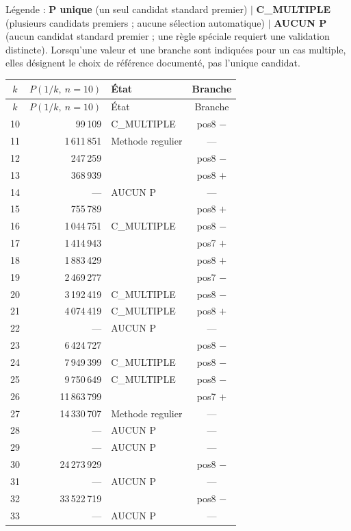 \documentclass[11pt,a4paper]{article}
\begin{document}
\begin{boitenote}
\begin{boitenote}[Inspiration]
\begin{boitenote}
\begin{boitenote}
Légende : \textbf{P unique} (un seul candidat standard premier) $\mid$
\textbf{C\_MULTIPLE} (plusieurs candidats premiers ; aucune sélection
automatique) $\mid$ \textbf{AUCUN P} (aucun candidat standard premier ; une
règle spéciale requiert une validation distincte). Lorsqu'une valeur et une
branche sont indiquées pour un cas multiple, elles désignent le choix de
référence documenté, pas l'unique candidat.

{\small
\begin{longtable}{@{}c r l c@{}}
\toprule
\rowcolor{spectralgris}
$k$ & $P(1/k,\ n=10)$ & État & Branche \\
\midrule
\endfirsthead
\toprule
\rowcolor{spectralgris}
$k$ & $P(1/k,\ n=10)$ & État & Branche \\
\midrule
\endhead
10 & 99\,109 & C\_MULTIPLE & pos8 $-$ \\
11 & 1\,611\,851 & Methode regulier & --- \\
12 & 247\,259 & & pos8 $-$ \\
13 & 368\,939 & & pos8 $+$ \\
14 & --- & AUCUN P & --- \\
15 & 755\,789 & & pos8 $+$ \\
16 & 1\,044\,751 & C\_MULTIPLE & pos8 $-$ \\
17 & 1\,414\,943 & & pos7 $+$ \\
18 & 1\,883\,429 & & pos8 $+$ \\
19 & 2\,469\,277 & & pos7 $-$ \\
20 & 3\,192\,419 & C\_MULTIPLE & pos8 $-$ \\
21 & 4\,074\,419 & C\_MULTIPLE & pos8 $+$ \\
22 & --- & AUCUN P & --- \\
23 & 6\,424\,727 & & pos8 $-$ \\
24 & 7\,949\,399 & C\_MULTIPLE & pos8 $-$ \\
25 & 9\,750\,649 & C\_MULTIPLE & pos8 $-$ \\
26 & 11\,863\,799 & & pos7 $+$ \\
27 & 14\,330\,707 & Methode regulier & --- \\
28 & --- & AUCUN P & --- \\
29 & --- & AUCUN P & --- \\
30 & 24\,273\,929 & & pos8 $-$ \\
31 & --- & AUCUN P & --- \\
32 & 33\,522\,719 & & pos8 $-$ \\
33 & --- & AUCUN P & --- \\

\end{longtable}}
\end{boitenote}
\end{boitenote}
\end{boitenote}
\end{boitenote}
\end{document}
